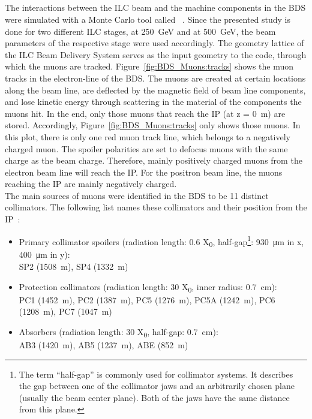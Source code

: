 \subsection{\mucarlo}
\label{BDS_Muons:MUCARLO}
The interactions between the ILC beam and the machine components in the BDS were simulated with a Monte Carlo tool called \mucarlo~\cite{Mucarlo,MuonBkg_05TeV,MuonBkg_1TeV}.
Since the presented study is done for two different ILC stages, at \SI{250}{\GeV} and at \SI{500}{\GeV}, the beam parameters of the respective stage were used accordingly.
The geometry lattice of the ILC Beam Delivery System serves as the input geometry to the \mucarlo code, through which the muons are tracked.
Figure~\ref{fig:BDS_Muons:tracks} shows the muon tracks in the electron-line of the BDS.
The muons are created at certain locations along the beam line, are deflected by the magnetic field of beam line components, and lose kinetic energy through scattering in the material of the components the muons hit.
In the end, only those muons that reach the IP (at z = \SI{0}{\meter}) are stored.
Accordingly, Figure~\ref{fig:BDS_Muons:tracks} only shows those muons.
In this plot, there is only one red muon track line, which belongs to a negatively charged muon.
The spoiler polarities are set to defocus muons with the same charge as the beam charge.
Therefore, mainly positively charged muons from the electron beam line will reach the IP.
For the positron beam line, the muons reaching the IP are mainly negatively charged.
\\The main sources of muons were identified in the BDS to be 11 distinct collimators.
The following list names these collimators and their position from the IP~\cite{Lewis}:
\begin{itemize}
 \item Primary collimator spoilers (radiation length: 0.6 X\textsubscript{0}, half-gap\footnote{The term ``half-gap'' is commonly used for collimator systems.
 It describes the gap between one of the collimator jaws and an arbitrarily chosen plane (usually the beam center plane).
 Both of the jaws have the same distance from this plane.}: \SI{930}{\micro\meter} in x, \SI{400}{\micro\meter} in y):\\
  SP2 (\SI{1508}{\meter}), SP4 (\SI{1332}{\meter})
 \item Protection collimators (radiation length: 30 X\textsubscript{0}, inner radius: \SI{0.7}{\centi\meter}):\\
  PC1 (\SI{1452}{\meter}), PC2 (\SI{1387}{\meter}), PC5 (\SI{1276}{\meter}), PC5A (\SI{1242}{\meter}), PC6 (\SI{1208}{\meter}), PC7 (\SI{1047}{\meter})
 \item Absorbers (radiation length: 30 X\textsubscript{0}, half-gap: \SI{0.7}{\centi\meter}):\\
  AB3 (\SI{1420}{\meter}), AB5 (\SI{1237}{\meter}), ABE (\SI{852}{\meter})
\end{itemize}
